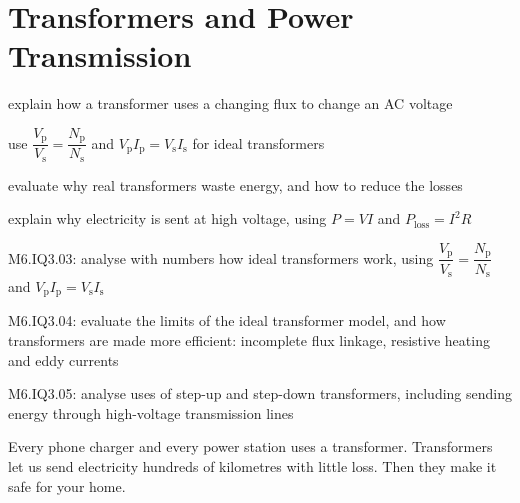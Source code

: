 \chapter{Transformers and Power Transmission}\label{ch4:chap}



\begin{goals}
  \item explain how a transformer uses a changing flux to change an AC voltage
  \item use $\dfrac{V_\mathrm{p}}{V_\mathrm{s}} = \dfrac{N_\mathrm{p}}{N_\mathrm{s}}$ and
        $V_\mathrm{p}I_\mathrm{p} = V_\mathrm{s}I_\mathrm{s}$ for ideal transformers
  \item evaluate why real transformers waste energy, and how to reduce the losses
  \item explain why electricity is sent at high voltage, using $P = VI$ and
        $P_\mathrm{loss} = I^2R$
\end{goals}

\begin{syllabus}
  \item M6.IQ3.03: analyse with numbers how ideal transformers work, using
        $\dfrac{V_\mathrm{p}}{V_\mathrm{s}} = \dfrac{N_\mathrm{p}}{N_\mathrm{s}}$ and
        $V_\mathrm{p}I_\mathrm{p} = V_\mathrm{s}I_\mathrm{s}$
  \item M6.IQ3.04: evaluate the limits of the ideal transformer model, and how
        transformers are made more efficient: incomplete flux linkage, resistive heating
        and eddy currents
  \item M6.IQ3.05: analyse uses of step-up and step-down transformers, including sending
        energy through high-voltage transmission lines
\end{syllabus}
Every phone charger and every power station uses a transformer. Transformers let us send
electricity hundreds of kilometres with little loss. Then they make it safe for your home.


